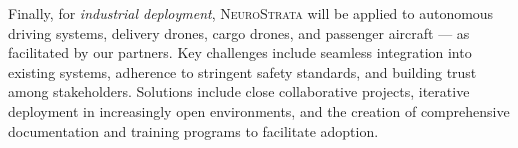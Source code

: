 Finally, for \textit{industrial deployment}, \textsc{NeuroStrata} will be applied to autonomous driving systems, delivery drones, cargo drones, and passenger aircraft --- as facilitated by our partners. Key challenges include seamless integration into existing systems, adherence to stringent safety standards, and building trust among stakeholders. Solutions include close collaborative projects, iterative deployment in increasingly open environments, and the creation of comprehensive documentation and training programs to facilitate adoption.


